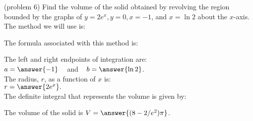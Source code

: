 \documentclass{ximera}
\begin{document}
\begin{problem}(problem 6)
Find the volume of the solid obtained by revolving the region bounded by the graphs of $y = 2e^x, y = 0, x = -1$, and $x = \ln 2$ about the $x$-axis.\\
The method we will use is:
\begin{multipleChoice}
\end{multipleChoice}

The formula associated with this method is:
\begin{multipleChoice}
\end{multipleChoice}

The left and right endpoints of integration are:\\
$a = \answer{-1}\;\;\;$ and $\;\;\; b = \answer{\ln 2}$.\\
The radius, $r$, as a function of $x$ is:\\
$r = \answer{2e^x}.$\\

The definite integral that represents the volume is given by:\\
\begin{multipleChoice}
\end{multipleChoice}

The volume of the solid is $V = \answer{(8-2/{e^2})\pi}$.

\end{problem}
\end{document}
